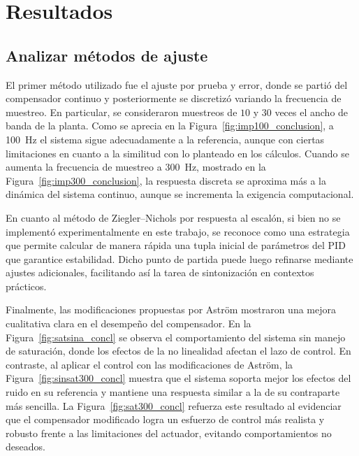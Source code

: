 \twocolumn
\section{Resultados}
\subsection{Analizar métodos de ajuste}


El primer método utilizado fue el ajuste por prueba y error, donde se partió del compensador continuo y posteriormente se discretizó variando la frecuencia de muestreo. En particular, se consideraron muestreos de \(10\) y \(30\) veces el ancho de banda de la planta. Como se aprecia en la Figura~\ref{fig:imp100_conclusion}, a \SI{100}{\hertz} el sistema sigue adecuadamente a la referencia, aunque con ciertas limitaciones en cuanto a la similitud con lo planteado en los cálculos. Cuando se aumenta la frecuencia de muestreo a \SI{300}{\hertz}, mostrado en la Figura~\ref{fig:imp300_conclusion}, la respuesta discreta se aproxima más a la dinámica del sistema continuo, aunque se incrementa la exigencia computacional.

En cuanto al método de Ziegler--Nichols por respuesta al escalón, si bien no se implementó experimentalmente en este trabajo, se reconoce como una estrategia que permite calcular de manera rápida una tupla inicial de parámetros del PID que garantice estabilidad. Dicho punto de partida puede luego refinarse mediante ajustes adicionales, facilitando así la tarea de sintonización en contextos prácticos.

Finalmente, las modificaciones propuestas por Astr\"om mostraron una mejora cualitativa clara en el desempeño del compensador. En la Figura~\ref{fig:satsina_concl} se observa el comportamiento del sistema sin manejo de saturación, donde los efectos de la no linealidad afectan el lazo de control. En contraste, al aplicar el control con las modificaciones de Astr\"om, la Figura~\ref{fig:sinsat300_concl} muestra que el sistema soporta mejor los efectos del ruido en su referencia y mantiene una respuesta similar a la de su contraparte más sencilla. La Figura~\ref{fig:sat300_concl} refuerza este resultado al evidenciar que el compensador modificado logra un esfuerzo de control más realista y robusto frente a las limitaciones del actuador, evitando comportamientos no deseados.


